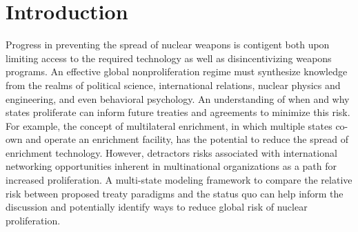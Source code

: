 \section{Introduction}
\label{s_motive}




Progress in preventing the spread of nuclear weapons is contigent both upon limiting access to the required technology as well as disincentivizing weapons programs. An effective global nonproliferation regime must synthesize knowledge from the realms of political science, international relations, nuclear physics and engineering, and even behavioral psychology. An understanding of when and why states proliferate can inform future treaties and agreements to minimize this risk. For example, the concept of multilateral enrichment, in which multiple states co-own and operate an enrichment facility, has the potential to reduce the spread of enrichment technology. However, detractors risks associated with international networking opportunities inherent in multinational organizations as a path for increased proliferation\cite{albright_2005, obeidi2005bomb}. A multi-state modeling framework to compare the relative risk between proposed treaty paradigms and the status quo can help inform the discussion and potentially identify ways to reduce global risk of nuclear proliferation.

